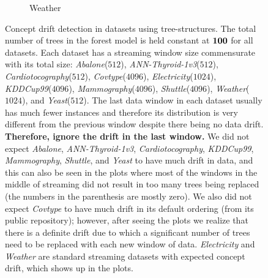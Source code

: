 \documentclass{article} %
\begin{document}
\begin{figure}
\begin{subfigure}[b]{0.23\textwidth}
      \caption{Weather}
      \label{fig:concept_drift_weather}
    \end{subfigure}
	\caption{Concept drift detection in datasets using tree-structures. The total number of trees in the forest model is held constant at ${\bf 100}$ for all datasets. Each dataset has a streaming window size commensurate with its total size: \textit{Abalone}($512$), \textit{ANN-Thyroid-1v3}($512$), \textit{Cardiotocography}($512$), \textit{Covtype}($4096$), \textit{Electricity}($1024$), \textit{KDDCup99}($4096$), \textit{Mammography}($4096$), \textit{Shuttle}($4096$), \textit{Weather}($1024$), and \textit{Yeast}($512$). The last data window in each dataset usually has much fewer instances and therefore its distribution is very different from the previous window despite there being no data drift. \textbf{Therefore, ignore the drift in the last window.} We did not expect \textit{Abalone}, \textit{ANN-Thyroid-1v3}, \textit{Cardiotocography}, \textit{KDDCup99}, \textit{Mammography}, \textit{Shuttle}, and \textit{Yeast} to have much drift in data, and this can also be seen in the plots where most of the windows in the middle of streaming did not result in too many trees being replaced (the numbers in the parenthesis are mostly zero). We also did not expect \textit{Covtype} to have much drift in its default ordering (from its public repository); however, after seeing the plots we realize that there is a definite drift due to which a significant number of trees need to be replaced with each new window of data. \textit{Electricity} and \textit{Weather} are standard streaming datasets with expected concept drift, which shows up in the plots.} \label{fig:concept_drift}
\end{figure}

\end{document}
